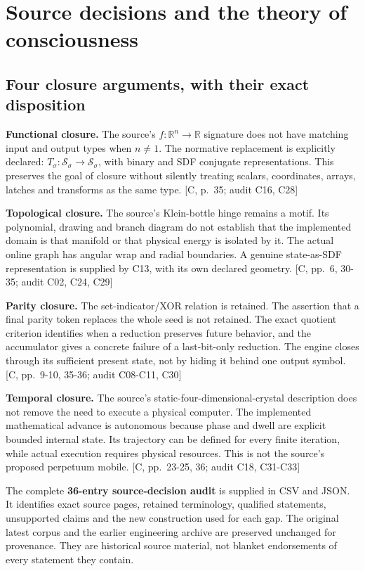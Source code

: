 \documentclass[11pt,a4paper]{article}
\begin{document}
\section{Source decisions and the theory of
consciousness}\label{source-decisions-and-the-theory-of-consciousness}

\subsection{Four closure arguments, with their exact
disposition}\label{four-closure-arguments-with-their-exact-disposition}

\textbf{Functional closure.} The source's \(f:\mathbb R^n\to\mathbb R\)
signature does not have matching input and output types when \(n\ne1\).
The normative replacement is explicitly declared:
\(T_\sigma:\mathcal S_\sigma\to\mathcal S_\sigma\), with binary and SDF
conjugate representations. This preserves the goal of closure without
silently treating scalars, coordinates, arrays, latches and transforms
as the same type. {[}C, p.~35; audit C16, C28{]}

\textbf{Topological closure.} The source's Klein-bottle hinge remains a
motif. Its polynomial, drawing and branch diagram do not establish that
the implemented domain is that manifold or that physical energy is
isolated by it. The actual online graph has angular wrap and radial
boundaries. A genuine state-as-SDF representation is supplied by C13,
with its own declared geometry. {[}C, pp.~6, 30-35; audit C02, C24,
C29{]}

\textbf{Parity closure.} The set-indicator/XOR relation is retained. The
assertion that a final parity token replaces the whole seed is not
retained. The exact quotient criterion identifies when a reduction
preserves future behavior, and the accumulator gives a concrete failure
of a last-bit-only reduction. The engine closes through its sufficient
present state, not by hiding it behind one output symbol. {[}C,
pp.~9-10, 35-36; audit C08-C11, C30{]}

\textbf{Temporal closure.} The source's static-four-dimensional-crystal
description does not remove the need to execute a physical computer. The
implemented mathematical advance is autonomous because phase and dwell
are explicit bounded internal state. Its trajectory can be defined for
every finite iteration, while actual execution requires physical
resources. This is not the source's proposed perpetuum mobile. {[}C,
pp.~23-25, 36; audit C18, C31-C33{]}

The complete \textbf{36-entry source-decision audit} is supplied in CSV
and JSON. It identifies exact source pages, retained terminology,
qualified statements, unsupported claims and the new construction used
for each gap. The original latest corpus and the earlier engineering
archive are preserved unchanged for provenance. They are historical
source material, not blanket endorsements of every statement they
contain.
\end{document}
